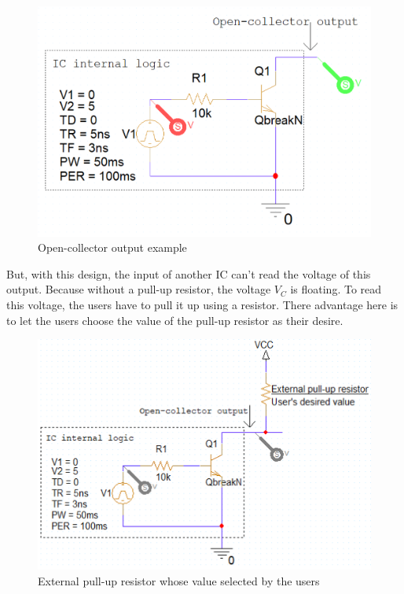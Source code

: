 \begin{figure}[H]
    \centering
    \includegraphics[width=12cm]{source/picture/bai_3/lab3_openCollector_example.png}
    \caption{Open-collector output example}
    \label{lab3_openCollector_example}
\end{figure}

But, with this design, the input of another IC can't read the voltage of this output. Because without a pull-up resistor, the voltage $V_C$ is floating. To read this voltage, the users have to pull it up using a resistor. There advantage here is to let the users choose the value of the pull-up resistor as their desire.

\begin{figure}[H]
    \centering
    \includegraphics[width=15cm]{source/picture/bai_3/lab3_externalPullUp.png}
    \caption{External pull-up resistor whose value selected by the users}
    \label{lab3_externalPullUp}
\end{figure}

